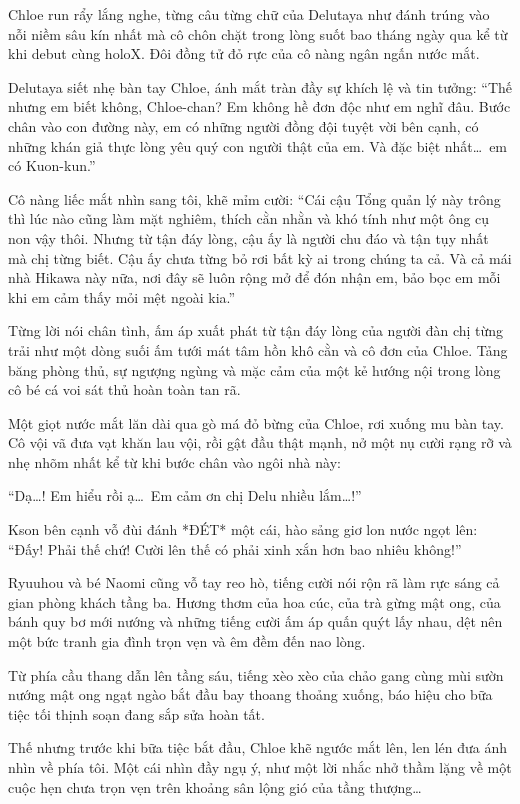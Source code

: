 \documentclass[../main.tex]{subfiles}
\begin{document}
Chloe run rẩy lắng nghe, từng câu từng chữ của Delutaya như đánh trúng vào nỗi niềm sâu kín nhất mà cô chôn chặt trong lòng suốt bao tháng ngày qua kể từ khi debut cùng holoX. Đôi đồng tử đỏ rực của cô nàng ngân ngấn nước mắt.

Delutaya siết nhẹ bàn tay Chloe, ánh mắt tràn đầy sự khích lệ và tin tưởng: ``Thế nhưng em biết không, Chloe-chan? Em không hề đơn độc như em nghĩ đâu. Bước chân vào con đường này, em có những người đồng đội tuyệt vời bên cạnh, có những khán giả thực lòng yêu quý con người thật của em. Và đặc biệt nhất\dots\ em có Kuon-kun.''

Cô nàng liếc mắt nhìn sang tôi, khẽ mỉm cười: ``Cái cậu Tổng quản lý này trông thì lúc nào cũng làm mặt nghiêm, thích cằn nhằn và khó tính như một ông cụ non vậy thôi. Nhưng từ tận đáy lòng, cậu ấy là người chu đáo và tận tụy nhất mà chị từng biết. Cậu ấy chưa từng bỏ rơi bất kỳ ai trong chúng ta cả. Và cả mái nhà Hikawa này nữa, nơi đây sẽ luôn rộng mở để đón nhận em, bảo bọc em mỗi khi em cảm thấy mỏi mệt ngoài kia.''

Từng lời nói chân tình, ấm áp xuất phát từ tận đáy lòng của người đàn chị từng trải như một dòng suối ấm tưới mát tâm hồn khô cằn và cô đơn của Chloe. Tảng băng phòng thủ, sự ngượng ngùng và mặc cảm của một kẻ hướng nội trong lòng cô bé cá voi sát thủ hoàn toàn tan rã.

Một giọt nước mắt lăn dài qua gò má đỏ bừng của Chloe, rơi xuống mu bàn tay. Cô vội vã đưa vạt khăn lau vội, rồi gật đầu thật mạnh, nở một nụ cười rạng rỡ và nhẹ nhõm nhất kể từ khi bước chân vào ngôi nhà này:

``Dạ\dots! Em hiểu rồi ạ\dots\ Em cảm ơn chị Delu nhiều lắm\dots!''

Kson bên cạnh vỗ đùi đánh *ĐÉT* một cái, hào sảng giơ lon nước ngọt lên: ``Đấy! Phải thế chứ! Cười lên thế có phải xinh xắn hơn bao nhiêu không!''

Ryuuhou và bé Naomi cũng vỗ tay reo hò, tiếng cười nói rộn rã làm rực sáng cả gian phòng khách tầng ba. Hương thơm của hoa cúc, của trà gừng mật ong, của bánh quy bơ mới nướng và những tiếng cười ấm áp quấn quýt lấy nhau, dệt nên một bức tranh gia đình trọn vẹn và êm đềm đến nao lòng.

Từ phía cầu thang dẫn lên tầng sáu, tiếng xèo xèo của chảo gang cùng mùi sườn nướng mật ong ngạt ngào bắt đầu bay thoang thoảng xuống, báo hiệu cho bữa tiệc tối thịnh soạn đang sắp sửa hoàn tất.

Thế nhưng trước khi bữa tiệc bắt đầu, Chloe khẽ ngước mắt lên, len lén đưa ánh nhìn về phía tôi. Một cái nhìn đầy ngụ ý, như một lời nhắc nhở thầm lặng về một cuộc hẹn chưa trọn vẹn trên khoảng sân lộng gió của tầng thượng\dots
\end{document}
